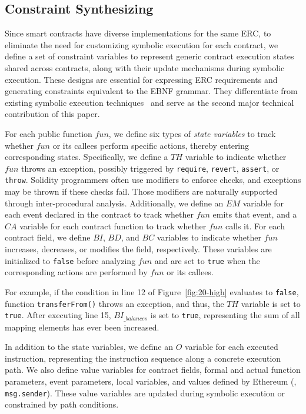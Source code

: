 \subsection{Constraint Synthesizing}
\label{sec:synthesizing}

Since smart contracts have diverse implementations for the same ERC, 
to eliminate the need for customizing symbolic execution for each contract, 
we define a set of constraint variables to represent generic contract execution states shared across contracts, along with their update mechanisms during symbolic execution. 
These designs are essential for expressing ERC requirements 
and generating constraints equivalent to the EBNF grammar. They differentiate \Tool{} from existing symbolic execution techniques~\cite{klee,S2E,SymCC} 
and serve as the second major technical contribution of this paper.



%
For each public function $fun$, 
we define six types of \emph{state variables} to track whether $fun$ or its callees perform specific actions, thereby entering corresponding states. 
Specifically, we define a $TH$ variable to indicate whether $fun$ throws an exception, possibly triggered by \texttt{require}, \texttt{revert}, \texttt{assert}, or \texttt{throw}. 
Solidity programmers often use modifiers to enforce checks, 
and exceptions may be thrown if these checks fail. 
Those modifiers are naturally supported 
through inter-procedural analysis. Additionally, we define an $EM$ 
variable for each event declared in the contract to track whether $fun$ emits that event, 
and a $CA$ variable for each contract function to track whether $fun$ calls it. For each contract field, we define $BI$, $BD$, and $BC$ variables to indicate 
whether $fun$ increases, decreases, or modifies the field, respectively. These variables are initialized to \texttt{false} before analyzing $fun$ and are set to \texttt{true} when the corresponding actions are performed by $fun$ or its callees.


For example, if the condition in line 12 of Figure~\ref{fig:20-high} evaluates to \texttt{false}, function \texttt{transferFrom()} throws an exception, and thus, the $TH$ variable 
is set to \texttt{true}. 
After executing line 15, $BI_{\_balances}$ 
is set to \texttt{true}, representing the sum of all mapping elements 
has ever been increased. %

In addition to the state variables, we define an $O$ variable for each executed instruction, representing the instruction sequence along a concrete execution path. 
We also define value variables for contract fields, formal and actual function parameters, event parameters, local variables, and values defined by Ethereum (\eg, \texttt{msg.sender}). These value variables are updated during symbolic execution 
or constrained by path conditions.


